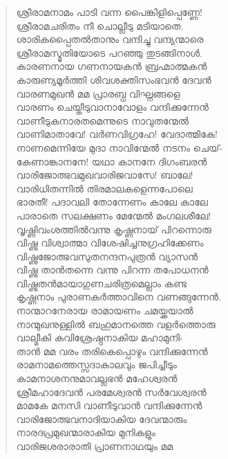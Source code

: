 \begin{verse}
ശ്രീരാമനാമം പാടി വന്ന പൈങ്കിളിപ്പെണ്ണേ!\\
ശ്രീരാമചരിതം നീ ചൊല്ലീടു മടിയാതെ.\\
ശാരികപ്പൈത‌‌‌ല്‍താനും വന്ദിച്ചു വന്ദ്യന്മാരെ\\
ശ്രീരാമസ്മൃതിയോടെ പറഞ്ഞു തുടങ്ങിനാള്‍.\\
കാരണനായ ഗണനായക‍ന്‍ ബ്രഹ്മാത്മകന്‍\\
കാരുണ്യമൂര്‍ത്തി ശിവശക്തിസംഭവന്‍ ദേവന്‍\\
വാരണമുഖന്‍ മമ പ്രാരബ്ധ വിഘ്നങ്ങളെ\\
വാരണം ചെയ്തീടുവാനാവോളം വന്ദിക്കുന്നേന്‍\\
വാണീടുകനാരതമെന്നുടെ നാവുതന്മേല്‍\\
വാണിമാതാവേ! വര്‍ണവിഗ്രഹേ! വേദാത്മികേ!\\
നാണമെന്നിയേ മുദാ നാവിന്മേല്‍ നടനം ചെയ്-\\
കേണാങ്കാനനേ! യഥാ കാനനേ ദിഗംബരന്‍\\
വാരിജോത്ഭവമുഖവാരിജവാസേ! ബാലേ!\\
വാരിധിതന്നില്‍ തിരമാലകളെന്നപോലെ\\
ഭാരതീ! പദാവലി തോന്നേണം കാലേ കാലേ\\
പാരാതെ സലക്ഷണം മേന്മേല്‍ മംഗലശീലേ!\\
വൃഷ്ണിവംശത്തില്‍വന്നു കൃഷ്ണനായ് പിറന്നൊരു\\
വിഷ്ണു വിശ്വാത്മാ വിശേഷിച്ചനുഗ്രഹിക്കേണം\\
വിഷ്ണുജോത്ഭവസുതനന്ദനപുത്രന്‍ വ്യാസന്‍\\
വിഷ്ണു താന്‍തന്നെ വന്നു പിറന്ന തപോധനന്‍\\
വിഷ്ണുതന്‍മായാഗുണചരിത്രമെല്ലാം കണ്ട\\
കൃഷ്ണനാം പുരാണകര്‍ത്താവിനെ വണങ്ങുന്നേന്‍.\\
നാന്മാറനേരായ രാമായണം ചമയ്ക്കയാല്‍\\
നാന്മുഖനുള്ളില്‍ ബഹുമാനത്തെ വളര്‍ത്തൊരു\\
വാല്മീകി കവിശ്രേഷ്ഠനാകിയ മഹാമുനി-\\
താന്‍ മമ വരം തരികെപ്പൊഴും വന്ദിക്കുന്നേന്‍\\
രാമനാമത്തെസ്സദാകാലവും ജപിച്ചീടും\\
കാമനാശനനുമാവല്ലഭന്‍ മഹേശ്വരന്‍\\
ശ്രീമഹാദേവന്‍ പരമേശ്വരന്‍ സര്‍വേശ്വരന്‍\\
മാമകേ മനസി വാണീടുവാന്‍ വന്ദിക്കുന്നേന്‍\\
വാരിജോത്ഭവനാദിയാകിയ ദേവന്മാരും\\
നാരദപ്രമുഖന്മാരാകിയ മുനികളും\\
വാരിജശരാരാതി പ്രാണനാഥയും മമ\\

\end{verse}
